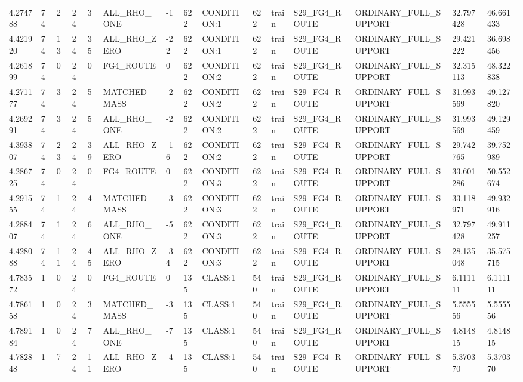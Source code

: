 \begin{tabular}{lllllllllllllll}
4.274788 & 74 & 2 & 24 & 3 & ALL\_RHO\_ONE & -1 & 622 & CONDITION:1 & 622 & train & S29\_FG4\_ROUTE & ORDINARY\_FULL\_SUPPORT & 32.797428 & 46.661433 \\
4.421920 & 74 & 13 & 24 & 35 & ALL\_RHO\_ZERO & -22 & 622 & CONDITION:1 & 622 & train & S29\_FG4\_ROUTE & ORDINARY\_FULL\_SUPPORT & 29.421222 & 36.698456 \\
4.261899 & 74 & 0 & 24 & 0 & FG4\_ROUTE & 0 & 622 & CONDITION:2 & 622 & train & S29\_FG4\_ROUTE & ORDINARY\_FULL\_SUPPORT & 32.315113 & 48.322838 \\
4.271177 & 74 & 3 & 24 & 5 & MATCHED\_MASS & -2 & 622 & CONDITION:2 & 622 & train & S29\_FG4\_ROUTE & ORDINARY\_FULL\_SUPPORT & 31.993569 & 49.127820 \\
4.269291 & 74 & 3 & 24 & 5 & ALL\_RHO\_ONE & -2 & 622 & CONDITION:2 & 622 & train & S29\_FG4\_ROUTE & ORDINARY\_FULL\_SUPPORT & 31.993569 & 49.129459 \\
4.393807 & 74 & 23 & 24 & 39 & ALL\_RHO\_ZERO & -16 & 622 & CONDITION:2 & 622 & train & S29\_FG4\_ROUTE & ORDINARY\_FULL\_SUPPORT & 29.742765 & 39.752989 \\
4.286725 & 74 & 0 & 24 & 0 & FG4\_ROUTE & 0 & 622 & CONDITION:3 & 622 & train & S29\_FG4\_ROUTE & ORDINARY\_FULL\_SUPPORT & 33.601286 & 50.552674 \\
4.291555 & 74 & 1 & 24 & 4 & MATCHED\_MASS & -3 & 622 & CONDITION:3 & 622 & train & S29\_FG4\_ROUTE & ORDINARY\_FULL\_SUPPORT & 33.118971 & 49.932916 \\
4.288407 & 74 & 1 & 24 & 6 & ALL\_RHO\_ONE & -5 & 622 & CONDITION:3 & 622 & train & S29\_FG4\_ROUTE & ORDINARY\_FULL\_SUPPORT & 32.797428 & 49.911257 \\
4.428088 & 74 & 11 & 24 & 45 & ALL\_RHO\_ZERO & -34 & 622 & CONDITION:3 & 622 & train & S29\_FG4\_ROUTE & ORDINARY\_FULL\_SUPPORT & 28.135048 & 35.575715 \\
4.783572 & 1 & 0 & 24 & 0 & FG4\_ROUTE & 0 & 135 & CLASS:1 & 540 & train & S29\_FG4\_ROUTE & ORDINARY\_FULL\_SUPPORT & 6.111111 & 6.111111 \\
4.786158 & 1 & 0 & 24 & 3 & MATCHED\_MASS & -3 & 135 & CLASS:1 & 540 & train & S29\_FG4\_ROUTE & ORDINARY\_FULL\_SUPPORT & 5.555556 & 5.555556 \\
4.789184 & 1 & 0 & 24 & 7 & ALL\_RHO\_ONE & -7 & 135 & CLASS:1 & 540 & train & S29\_FG4\_ROUTE & ORDINARY\_FULL\_SUPPORT & 4.814815 & 4.814815 \\
4.782848 & 1 & 7 & 24 & 11 & ALL\_RHO\_ZERO & -4 & 135 & CLASS:1 & 540 & train & S29\_FG4\_ROUTE & ORDINARY\_FULL\_SUPPORT & 5.370370 & 5.370370 \\

\end{tabular}
